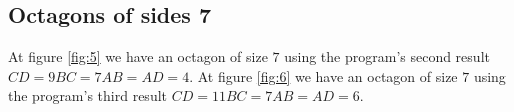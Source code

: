 \documentclass[11pt]{article}
\begin{document}
\subsection{Octagons of sides 7}

At figure \ref{fig:5} we have an octagon of size $7$ using the 
program's second result $CD=9 BC=7 AB=AD=4$.
At figure \ref{fig:6} we have an octagon of size $7$ using the
program's third result $CD=11 BC=7 AB=AD=6$.
\end{document}
